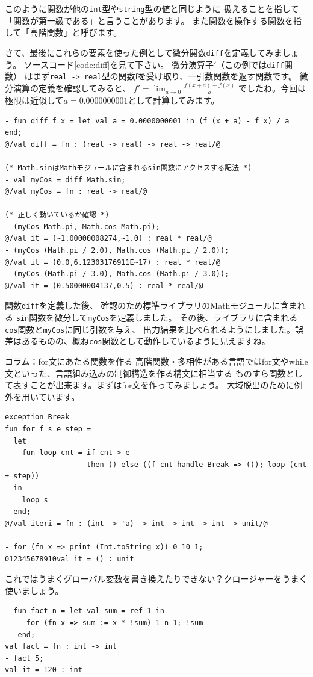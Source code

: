 \documentclass[11pt,a4paper]{article}
\begin{document}
このように関数が他の\lstinline{int}型や\lstinline{string}型の値と同じように
扱えることを指して「関数が第一級である」と言うことがあります。
また関数を操作する関数を指して「高階関数」と呼びます。

さて、最後にこれらの要素を使った例として微分関数\lstinline{diff}を定義してみましょう。
ソースコード\ref{code:diff}を見て下さい。
微分演算子$'$（この例では\lstinline{diff}関数）
はまず\lstinline{real -> real}型の関数fを受け取り、一引数関数を返す関数です。
微分演算の定義を確認してみると、
$f' = \lim_{a \to 0}\frac{f(x+a) - f(x)}{a}$
でしたね。今回は極限は近似して$a = 0.0000000001$として計算してみます。

\begin{lstlisting}[caption=高階関数の例,label=code:diff]
- fun diff f x = let val a = 0.0000000001 in (f (x + a) - f x) / a end;
@/val diff = fn : (real -> real) -> real -> real/@

(* Math.sinはMathモジュールに含まれるsin関数にアクセスする記法 *)
- val myCos = diff Math.sin;
@/val myCos = fn : real -> real/@

(* 正しく動いているか確認 *)
- (myCos Math.pi, Math.cos Math.pi);
@/val it = (~1.00000008274,~1.0) : real * real/@
- (myCos (Math.pi / 2.0), Math.cos (Math.pi / 2.0));
@/val it = (0.0,6.12303176911E~17) : real * real/@
- (myCos (Math.pi / 3.0), Math.cos (Math.pi / 3.0));
@/val it = (0.50000004137,0.5) : real * real/@
\end{lstlisting}

関数\lstinline{diff}を定義した後、
確認のため標準ライブラリのMathモジュールに含まれる
\lstinline{sin}関数を微分して\lstinline{myCos}を定義しました。
その後、ライブラリに含まれる\lstinline{cos}関数と\lstinline{myCos}に同じ引数を与え、
出力結果を比べられるようにしました。誤差はあるものの、概ね\lstinline{cos}関数として動作しているように見えますね。

\begin{itembox}[l]{コラム：for文にあたる関数を作る}
高階関数・多相性がある言語ではfor文やwhile文といった、言語組み込みの制御構造を作る構文に相当する
ものすら関数として表すことが出来ます。まずはfor文を作ってみましょう。
大域脱出のために例外を用いています。

\begin{lstlisting}[caption=for文相当の関数,label=code:for]
exception Break
fun for f s e step =
  let
    fun loop cnt = if cnt > e
                   then () else ((f cnt handle Break => ()); loop (cnt + step))
  in
    loop s
  end;
@/val iteri = fn : (int -> 'a) -> int -> int -> int -> unit/@

- for (fn x => print (Int.toString x)) 0 10 1;
012345678910val it = () : unit
\end{lstlisting}

これではうまくグローバル変数を書き換えたりできない？クロージャーをうまく使いましょう。
\begin{lstlisting}[caption=関数forを使ってみる,label=code:use-iteri]
- fun fact n = let val sum = ref 1 in
     for (fn x => sum := x * !sum) 1 n 1; !sum
   end;
val fact = fn : int -> int
- fact 5;
val it = 120 : int
\end{lstlisting}

\end{itembox}
\end{document}
